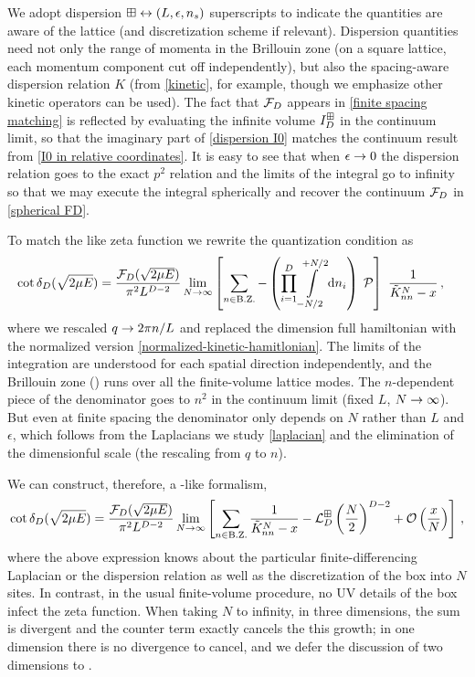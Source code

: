 We adopt dispersion $\boxplus \leftrightarrow (L, \epsilon, {n_s})$ superscripts to indicate the quantities are aware of the lattice (and discretization scheme if relevant).
Dispersion quantities need not only the range of momenta in the Brillouin zone (on a square lattice, each momentum component cut off independently), but also the spacing-aware dispersion relation $K$ (from \eqref{kinetic}, for example, though we emphasize other kinetic operators can be used).
The fact that $\mathcal{F}_D$ appears in \eqref{finite spacing matching} is reflected by evaluating the infinite volume $I_D^{\boxplus}$ in the continuum limit, so that the imaginary part of \eqref{dispersion I0} matches the continuum result from \eqref{I0 in relative coordinates}.
It is easy to see that when $\epsilon\rightarrow0$ the dispersion relation goes to the exact $p^2$ relation and the limits of the integral go to infinity so that we may execute the integral spherically and recover the continuum $\mathcal{F}_D$ in \eqref{spherical FD}.

To match the \Luscher like zeta function we rewrite the quantization condition as
\begin{align}\label{eq:dispersion-counter-integral}
    \cot \delta_D(\sqrt{2 \mu E})
    &=
    \frac{\mathcal{F}_D(\sqrt{2 \mu E})}{\pi^2 L^{D-2}}
    \lim_{N\rightarrow\infty}
    \left[
    	\sum_{n\in\text{B.Z.}} -
		\left(\prod_{i=1}^D
    		\int\limits_{-N/2}^{+N/2}
    		\mathrm{d} n_i
    	\right)\; \mathcal{P}
	\right]\  \frac{1}{\tilde K_{nn}^{N}-x}
	\, ,
\end{align}
where we rescaled $q\rightarrow 2\pi n/L$ and replaced the dimension full hamiltonian with the normalized version \eqref{normalized-kinetic-hamitlonian}.
The limits of the integration are understood for each spatial direction independently, and the Brillouin zone (\BZ) runs over all the finite-volume lattice modes.
The $n$-dependent piece of the denominator goes to $n^2$ in the continuum limit (fixed $L$, $N\rightarrow\infty$).
But even at finite spacing the denominator only depends on $N$ rather than $L$ and $\epsilon$, which follows from the Laplacians we study \eqref{laplacian} and the elimination of the dimensionful scale (the rescaling from $q$ to $n$).

We can construct, therefore, a \Luscher-like formalism,
\begin{align}
    \label{eq:dispersion quantization}
    \cot \delta_D( \sqrt{2 \mu E} )
    =
	\frac{\mathcal{F}_D(\sqrt{2 \mu E})}{\pi^2 L^{D-2}}
	\lim_{N\rightarrow\infty}
    \left[
    	\sum_{n\in\text{B.Z.}}\frac{1}{ \tilde K_{nn}^{N} - x} - \mathcal{L}_D^{\boxplus}\left(\frac{N}{2}\right)^{D-2}
		+ \mathcal O\left(\frac{x}{N}\right)
	\right]\, ,
\end{align}
where the above expression knows about the particular finite-differencing Laplacian or the dispersion relation as well as the discretization of the box into $N$ sites.
In contrast, in the usual finite-volume procedure, no UV details of the box infect the zeta function.
When taking $N$ to infinity, in three dimensions, the sum is divergent and the counter term exactly cancels the this growth; in one dimension there is no divergence to cancel, and we defer the discussion of two dimensions to .

